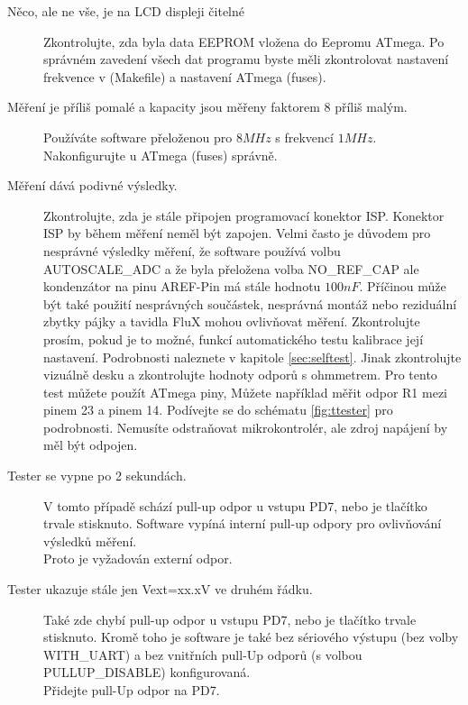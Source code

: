 \begin{description}
\item[Něco, ale ne vše, je na LCD displeji čitelné] 
Zkontrolujte, zda byla data EEPROM vložena do Eepromu ATmega.
Po správném zavedení všech dat programu byste měli zkontrolovat nastavení frekvence v (Makefile)
a nastavení ATmega (fuses).

\item[Měření je příliš pomalé a kapacity jsou měřeny faktorem 8 příliš malým.] 
Používáte software přeloženou pro \(8MHz\) s frekvencí \(1MHz\).
Nakonfigurujte u ATmega (fuses) správně.

\item[Měření dává podivné výsledky.]  
Zkontrolujte, zda je stále připojen programovací konektor ISP. Konektor ISP by během měření neměl být zapojen.
Velmi často je důvodem pro nesprávné výsledky měření, že software používá volbu
AUTOSCALE\_ADC a že byla přeložena volba NO\_REF\_CAP ale kondenzátor na pinu AREF-Pin má stále
hodnotu \(100nF\).
Příčinou může být také použití nesprávných součástek,
nesprávná montáž nebo reziduální zbytky pájky a tavidla FluX mohou ovlivňovat měření.
Zkontrolujte prosím, pokud je to možné, funkcí automatického testu kalibrace její nastavení.
Podrobnosti naleznete v kapitole \ref{sec:selftest}.
Jinak zkontrolujte vizuálně desku a zkontrolujte hodnoty odporů s ohmmetrem.
Pro tento test můžete použít ATmega piny,
Můžete například měřit odpor R1 mezi pinem 23 a pinem 14.
Podívejte se do schématu \ref{fig:ttester} pro podrobnosti.
Nemusíte odstraňovat mikrokontrolér, ale zdroj napájení by měl být odpojen.

\item[Tester se vypne po 2 sekundách.]  
V tomto případě schází pull-up odpor u vstupu PD7, nebo je tlačítko trvale stisknuto.
Software vypíná interní pull-up odpory pro ovlivňování výsledků měření.\\ Proto je vyžadován externí odpor.

\item[Tester ukazuje stále jen Vext=xx.xV ve druhém řádku.]
Také zde chybí pull-up odpor u vstupu PD7, nebo je tlačítko trvale stisknuto.
Kromě toho je software je také bez sériového výstupu (bez volby WITH\_UART) a bez vnitřních
pull-Up odporů (s volbou PULLUP\_DISABLE) konfigurovaná.\\
Přidejte pull-Up odpor na PD7.

\end{description}
